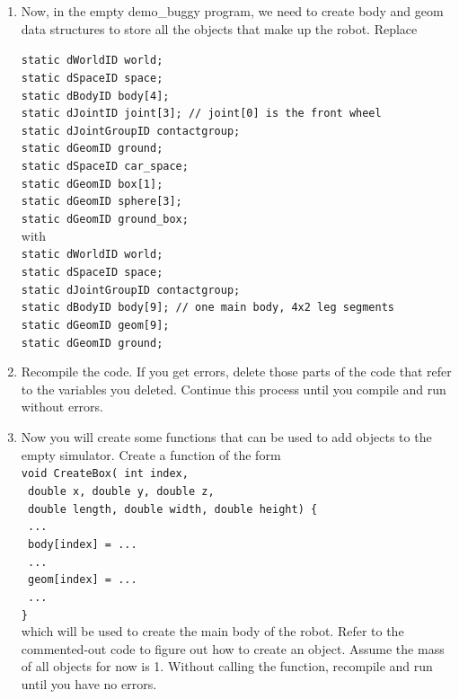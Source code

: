 \documentclass[12pt]{article}
\begin{document}
\begin{enumerate}
\item Now, in the empty demo\_buggy program, we need to create body and geom data structures to store all the objects that make up the robot. Replace

\texttt{static dWorldID world;}\\
\texttt{static dSpaceID space;}\\
\texttt{static dBodyID body[4];}\\
\texttt{static dJointID joint[3];	// joint[0] is the front wheel}\\
\texttt{static dJointGroupID contactgroup;}\\
\texttt{static dGeomID ground;}\\
\texttt{static dSpaceID car\_space;}\\
\texttt{static dGeomID box[1];}\\
\texttt{static dGeomID sphere[3];}\\
\texttt{static dGeomID ground\_box;}\\
    with \\
\texttt{static dWorldID world;}\\
\texttt{static dSpaceID space;}\\
\texttt{static dJointGroupID contactgroup;}\\
\texttt{static dBodyID body[9]; // one main body, 4x2 leg segments}\\
\texttt{static dGeomID geom[9];\\
static dGeomID ground;}\\

\item Recompile the code. If you get errors, delete those parts of the code that refer to the variables you deleted. Continue this process until you compile and run without errors.

\item Now you will create some functions that can be used to add objects to the empty simulator. Create a function of the form \\
\texttt{void CreateBox(	int index,}\\
\texttt{				double x, double y, double z,}\\
\texttt{				double length, double width, double height) \{}\\
\texttt{	...}\\
\texttt{	body[index] = ...}\\
\texttt{	...}\\
\texttt{	geom[index] = ...}\\
\texttt{	...}\\
\texttt{\}} \\
which will be used to create the main body of the robot. Refer to the commented-out code to figure out how to create an object. Assume the mass of all objects for now is 1. Without calling the function, recompile and run until you have no errors.


\end{enumerate}
\end{document}
